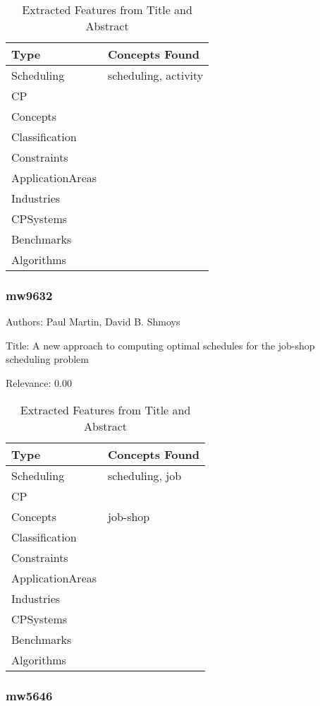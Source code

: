 {\scriptsize
\begin{longtable}{p{2cm}p{20cm}}
\caption{Extracted Features from Title and Abstract}\\ \toprule
Type & Concepts Found\\ \midrule
\endhead
\bottomrule
\endfoot
Scheduling & scheduling, activity\\ 
CP & \\ 
Concepts & \\ 
Classification & \\ 
Constraints & \\ 
ApplicationAreas & \\ 
Industries & \\ 
CPSystems & \\ 
Benchmarks & \\ 
Algorithms & \\ 
\end{longtable}
}



\subsubsection{mw9632}
\label{mw:mw9632}

Authors: Paul Martin, David B. Shmoys

Title: A new approach to computing optimal schedules for the job-shop scheduling problem

Relevance:  0.00

{\scriptsize
\begin{longtable}{p{2cm}p{20cm}}
\caption{Extracted Features from Title and Abstract}\\ \toprule
Type & Concepts Found\\ \midrule
\endhead
\bottomrule
\endfoot
Scheduling & scheduling, job\\ 
CP & \\ 
Concepts & job-shop\\ 
Classification & \\ 
Constraints & \\ 
ApplicationAreas & \\ 
Industries & \\ 
CPSystems & \\ 
Benchmarks & \\ 
Algorithms & \\ 
\end{longtable}
}



\subsubsection{mw5646}
\label{mw:mw5646}

